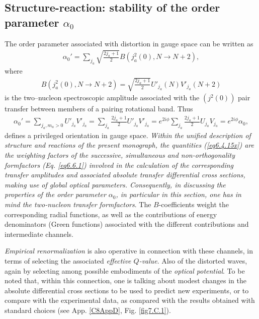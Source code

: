 \subsection{Structure-reaction: stability of the order parameter $\alpha_0$}\label{C6S2.3}
The order parameter associated with distortion in gauge space can be written as 
\begin{align}\label{eq7.2.1}
\alpha_0'=\sum_{j_a}\sqrt{\frac{2j_a+1}{2}}B(j^2_a(0),N\to N+2),
\end{align}
where
\begin{align}\label{eq6.4.15x}
B(j^2_a(0),N\to N+2)=\sqrt{\frac{2j_a+1}{2}}U'_{j_a}(N)V'_{j_a}(N+2)
\end{align}
is the two--nucleon spectroscopic amplitude associated with the $(j^2(0))$ pair transfer between members of a pairing rotational band. Thus 
\begin{align}\label{eq6.4.15}
\alpha_0'=\sum_{j_a,m_a>0}U'_{j_a}V'_{j_a}=\sum_{j_a}\frac{2j_a+1}{2}U'_{j_a}V'_{j_a}=e^{2i\phi}\sum_{j_a}\frac{2j_a+1}{2}U_{j_a}V_{j_a}=e^{2i\phi}\alpha_0,
\end{align}
defines a privileged orientation in gauge space. \textit{Within the unified description of structure and reactions of the present monograph, the quantities (\ref{eq6.4.15x}) are the weighting factors of the successive, simultaneous and non-orthogonality formfactors (Eq. \ref{eq6.6.1}) involved in the calculation of the corresponding transfer amplitudes and associated absolute transfer differential cross sections, making use of global optical parameters. Consequently, in discussing the properties of the order parameter $\alpha_0$, in particular in this section, one has in mind the two-nucleon transfer formfactors}.  The $B$-coefficients weight the corresponding radial functions, as well as the contributions of energy denominators (Green functions) associated with the different contributions and intermediate channels.


 \textit{Empirical renormalization} is also operative in connection with these channels, in terms of selecting the associated \emph{effective $Q$-value}. Also of the distorted waves, again by selecting among possible embodiments of the \textit{optical potential}. To be noted that, within this connection, one is talking about  modest changes in the absolute differential cross sections to be used to predict new experiments, or to compare with the experimental data, as compared with the results obtained with standard choices (see  App. \ref{C8AppD}, Fig. \ref{fig7.C.1}).

